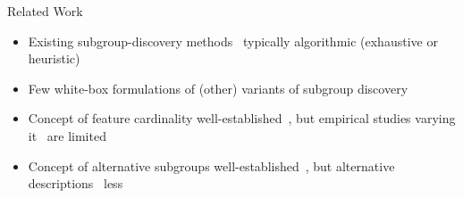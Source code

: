 \documentclass[en, navbaroff]{sdqbeamer}
\begin{document}
\begin{frame}[t]{Related Work}
	\begin{itemize}
		\item Existing subgroup-discovery methods~\cite{atzmueller2015subgroup, helal2016subgroup, herrera2011overview, ventura2018subgroup} typically algorithmic (exhaustive or heuristic)
		\item Few white-box formulations of (other) variants of subgroup discovery~\cite{bonates2008maximum, eckstein2002maximum, guns2011itemset, koccak2020exploiting, louveaux2014combinatorial}
		\item Concept of feature cardinality well-established~\cite{herrera2011overview, meeng2021real}, but empirical studies varying it~\cite{friedman1999bump, lemmerich2010fast, meeng2021real, proencca2022robust} are limited
		\item Concept of alternative subgroups well-established~\cite{atzmueller2015subgroup, belfodil2019fssd, bosc2018anytime, leeuwen2012diverse, lucas2018ssdp+}, but alternative descriptions~\cite{boley2009non, galbrun2017redescription, leeuwen2012diverse, lopez2023discovering} less
	\end{itemize}
\end{frame}
\end{document}
